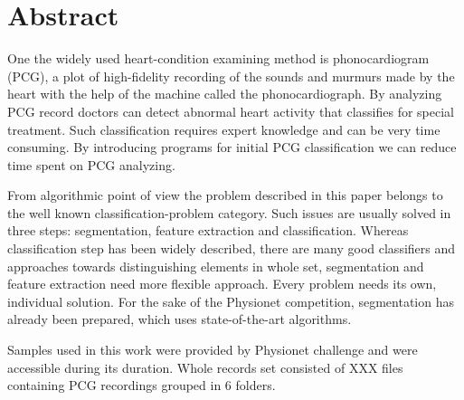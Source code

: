 \documentclass[10pt,a4paper]{article}
\begin{document}
\section{Abstract}
One the widely used heart-condition examining method is phonocardiogram (PCG), a plot of high-fidelity recording of the sounds and murmurs made by the heart with the help of the machine called the phonocardiograph. By analyzing PCG record doctors can detect abnormal heart activity that classifies for special treatment. Such classification requires expert knowledge and can be very time consuming. By introducing programs for initial PCG classification we can reduce time spent on PCG analyzing.

From algorithmic point of view the problem described in this paper belongs to the well known classification-problem category. Such issues are usually solved in three steps: segmentation, feature extraction and classification. Whereas classification step has been widely described, there are many good classifiers and approaches towards distinguishing elements in whole set, segmentation and feature extraction need more flexible approach. Every problem needs its own, individual solution. For the sake of the Physionet competition, segmentation has already been prepared, which uses state-of-the-art algorithms. %

Samples used in this work were provided by Physionet challenge and were accessible during its duration. Whole records set consisted of XXX files containing PCG recordings grouped in 6 folders.
\end{document}
